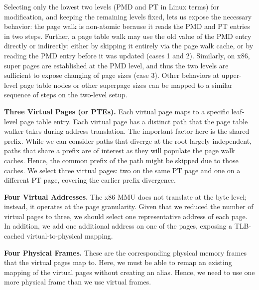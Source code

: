 Selecting only the lowest two levels (PMD and PT in Linux terms) for modification, and keeping the remaining levels fixed, lets us expose the necessary behavior: the page walk is non-atomic because it reads the PMD and PT entries in two steps. 
Further, a page table walk may use the old value of the PMD entry directly or indirectly: either by skipping it entirely via the page walk cache, or by reading the PMD entry before it was updated (cases 1 and 2). Similarly, on x86, super pages are established at the PMD level, and thus the two levels are sufficient to expose changing of page sizes (case 3). Other behaviors at upper-level page table nodes or other superpage sizes can be mapped to a similar sequence of steps on the two-level setup.


\noindent\textbf{Three Virtual Pages (or PTEs).}
Each virtual page maps to a specific leaf-level page table entry. Each virtual page has a distinct path that the page table walker takes during address translation. The important factor here is the shared prefix. While we can consider paths that diverge at the root largely independent, paths that share a prefix are of interest as they will populate the page walk caches. Hence, the common prefix of the path might be skipped due to those caches.
We select three virtual pages: two on the same PT page and one on a different PT page, covering the earlier prefix divergence.


\noindent\textbf{Four Virtual Addresses.}
The x86 MMU does not translate at the byte level; instead, it operates at the page granularity. Given that we reduced the number of virtual pages to three, we should select one representative address of each page. In addition, we add one additional address on one of the pages, exposing a TLB-cached virtual-to-physical mapping.

\noindent\textbf{Four Physical Frames.}
These are the corresponding physical memory frames that the virtual pages map to. Here, we must be able to remap an existing mapping of the virtual pages without creating an alias. Hence, we need to use one more physical frame than we use virtual frames.

